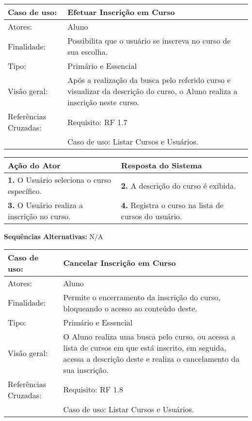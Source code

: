 \documentclass[12pt,a4paper,onecolumn,titlepage]{article}
\begin{document}

\begin{table}[h!]
\begin{center}
\begin{tabular}{p{2.5cm} p{9.5cm}}
Caso de uso: & \textbf{Efetuar Inscrição em Curso} \\ \hline
Atores: & Aluno \\ \hline
Finalidade: & Possibilita que o usuário se inscreva no curso de sua escolha. \\ \hline
Tipo: & Primário e Essencial\\ \hline
Visão geral: & Após a realização da busca pelo referido curso e visualizar da descrição do curso, o Aluno realiza a inscrição neste curso. \\ \hline
Referências Cruzadas: & Requisito: RF 1.7 \\ & Caso de uso: Listar Cursos e Usuários.

\end{tabular}
\end{center}
\end{table}


\begin{center}
\def\arraystretch{1.1}
\begin{tabular}{|p{6cm}|p{6cm}|}

\hline
\textbf{Ação do Ator} & \textbf{Resposta do Sistema} \\ \hline
\textbf{1.} O Usuário seleciona o curso específico. & \textbf{2.} A descrição do curso é exibida. \\ \hline
\textbf{3.} O Usuário realiza a inscrição no curso. & \textbf{4.} Registra o curso na lista de cursos do usuário. \\ \hline
\end{tabular}
\end{center}
\textbf{Sequências Alternativas:} N/A
\newpage



\begin{table}[h!]
\begin{center}
\begin{tabular}{p{2.5cm} p{9.5cm}}
Caso de uso: & \textbf{Cancelar Inscrição em Curso} \\ \hline
Atores: & Aluno \\ \hline
Finalidade: & Permite o encerramento da inscrição do curso, bloqueando o acesso ao conteúdo deste. \\ \hline
Tipo: & Primário e Essencial\\ \hline
Visão geral: & O Aluno realiza uma busca pelo curso, ou acessa a lista de cursos em que está inscrito, em seguida, acessa a descrição deste e realiza o cancelamento da sua inscrição. \\ \hline
Referências Cruzadas: & Requisito: RF 1.8 \\ & Caso de uso: Listar Cursos e Usuários.
\end{tabular}
\end{center}
\end{table}
\end{document}
